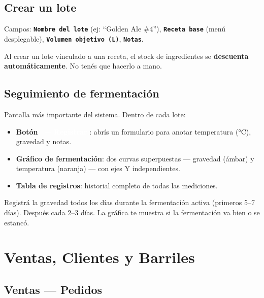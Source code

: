 \documentclass[11pt,a4paper]{report}
\newcommand{\appbtn}[1]{%
  \textcolor{white}{\colorbox{beer}{\footnotesize\sffamily\bfseries\ #1}}%
}
\newcommand{\appfield}[1]{\texttt{\footnotesize\color{beerdark}\textbf{#1}}}
\begin{document}
\section{Crear un lote}

Campos: \appfield{Nombre del lote} (ej: ``Golden Ale \#4''), \appfield{Receta base} (menú desplegable), \appfield{Volumen objetivo (L)}, \appfield{Notas}.

\begin{warnbox}
Al crear un lote vinculado a una receta, el stock de ingredientes se \textbf{descuenta automáticamente}. No tenés que hacerlo a mano.
\end{warnbox}

\section{Seguimiento de fermentación}

Pantalla más importante del sistema. Dentro de cada lote:

\begin{itemize}
  \item \textbf{Botón \appbtn{+ Registrar}}: abrís un formulario para anotar temperatura (°C), gravedad y notas.
  \item \textbf{Gráfico de fermentación}: dos curvas superpuestas — gravedad (ámbar) y temperatura (naranja) — con ejes Y independientes.
  \item \textbf{Tabla de registros}: historial completo de todas las mediciones.
\end{itemize}

\begin{tipbox}
Registrá la gravedad todos los días durante la fermentación activa (primeros 5--7 días). Después cada 2--3 días. La gráfica te muestra si la fermentación va bien o se estancó.
\end{tipbox}

\chapter{Ventas, Clientes y Barriles}

\section{Ventas — Pedidos}
\end{document}
